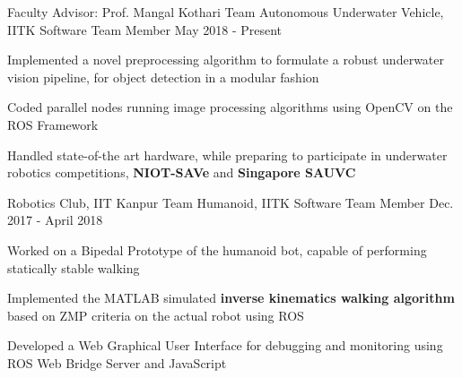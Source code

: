 
\begin{cventries}

  \cventry
    {Faculty Advisor: Prof. Mangal Kothari}
    {Team Autonomous Underwater Vehicle, IITK}
    {Software Team Member}
    {May 2018 - Present}
    {
      \begin{cvitems}
        \item {Implemented a novel preprocessing algorithm to formulate a robust underwater vision pipeline, for object detection in a modular fashion}
        \item {Coded parallel nodes running image processing algorithms using OpenCV on the ROS Framework}
        \item {Handled state-of-the art hardware, while preparing to participate in underwater robotics competitions, \textbf{NIOT-SAVe} and \textbf{Singapore SAUVC} }
      \end{cvitems}
    }

    \cventry
    {Robotics Club, IIT Kanpur}
    {Team Humanoid, IITK}
    {Software Team Member}
    {Dec. 2017 - April 2018} 
    {
      \begin{cvitems} 
        \item {Worked on a Bipedal Prototype of the humanoid bot, capable of performing statically stable walking}
        \item {Implemented the MATLAB simulated \textbf{inverse kinematics walking algorithm} based on ZMP criteria on the actual robot using ROS}
        \item {Developed a Web Graphical User Interface for debugging and monitoring using ROS Web Bridge Server and JavaScript}
      \end{cvitems}
    }
\end{cventries}
